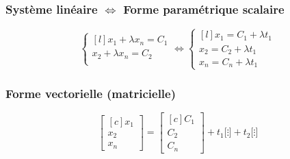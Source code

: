 \subsubsection{Système linéaire $\Longleftrightarrow$ Forme paramétrique scalaire}
\begin{equation*}
    \left\{
    \begin{matrix*}[l]
    x_1 + \lambda x_n = C_1 \\
    x_2 + \lambda x_n = C_2\\
    \end{matrix*}
    \right.
    \Longleftrightarrow
    \left\{
    \begin{matrix*}[l]
    x_1 = C_1 + \lambda t_1 \\
    x_2 = C_2 + \lambda t_1\\
    x_n = C_n + \lambda t_1
    \end{matrix*}
    \right.
\end{equation*}

\subsubsection{Forme vectorielle (matricielle)}
\begin{equation*}
    \begin{bmatrix*}[c]
        x_1\\ x_2 \\ x_n
    \end{bmatrix*}
    =
    \begin{bmatrix*}[c]
        C_1\\ C_2 \\ C_n
    \end{bmatrix*}+ t_1 \Bigg[\vdots\Bigg] + t_2 \Bigg[\vdots\Bigg]
\end{equation*}